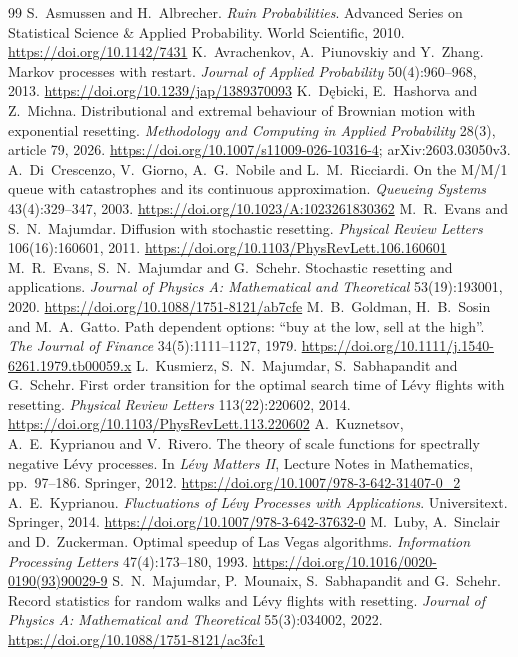 \documentclass[11pt,a4paper]{article}
\begin{document}
\begin{thebibliography}{99}\small
{} S.~Asmussen and H.~Albrecher. \emph{Ruin Probabilities}. Advanced Series on Statistical Science \& Applied Probability. World Scientific, 2010. \url{https://doi.org/10.1142/7431}
 K.~Avrachenkov, A.~Piunovskiy and Y.~Zhang. Markov processes with restart. \emph{Journal of Applied Probability} 50(4):960--968, 2013. \url{https://doi.org/10.1239/jap/1389370093}
 K.~D\k{e}bicki, E.~Hashorva and Z.~Michna. Distributional and extremal behaviour of Brownian motion with exponential resetting. \emph{Methodology and Computing in Applied Probability} 28(3), article 79, 2026. \url{https://doi.org/10.1007/s11009-026-10316-4}; arXiv:2603.03050v3.
 A.~Di~Crescenzo, V.~Giorno, A.~G.~Nobile and L.~M.~Ricciardi. On the M/M/1 queue with catastrophes and its continuous approximation. \emph{Queueing Systems} 43(4):329--347, 2003. \url{https://doi.org/10.1023/A:1023261830362}
 M.~R.~Evans and S.~N.~Majumdar. Diffusion with stochastic resetting. \emph{Physical Review Letters} 106(16):160601, 2011. \url{https://doi.org/10.1103/PhysRevLett.106.160601}
 M.~R.~Evans, S.~N.~Majumdar and G.~Schehr. Stochastic resetting and applications. \emph{Journal of Physics A: Mathematical and Theoretical} 53(19):193001, 2020. \url{https://doi.org/10.1088/1751-8121/ab7cfe}
 M.~B.~Goldman, H.~B.~Sosin and M.~A.~Gatto. Path dependent options: ``buy at the low, sell at the high''. \emph{The Journal of Finance} 34(5):1111--1127, 1979. \url{https://doi.org/10.1111/j.1540-6261.1979.tb00059.x}
 L.~Kusmierz, S.~N.~Majumdar, S.~Sabhapandit and G.~Schehr. First order transition for the optimal search time of L\'evy flights with resetting. \emph{Physical Review Letters} 113(22):220602, 2014. \url{https://doi.org/10.1103/PhysRevLett.113.220602}
 A.~Kuznetsov, A.~E.~Kyprianou and V.~Rivero. The theory of scale functions for spectrally negative L\'evy processes. In \emph{L\'evy Matters II}, Lecture Notes in Mathematics, pp.~97--186. Springer, 2012. \url{https://doi.org/10.1007/978-3-642-31407-0_2}
 A.~E.~Kyprianou. \emph{Fluctuations of L\'evy Processes with Applications}. Universitext. Springer, 2014. \url{https://doi.org/10.1007/978-3-642-37632-0}
 M.~Luby, A.~Sinclair and D.~Zuckerman. Optimal speedup of Las Vegas algorithms. \emph{Information Processing Letters} 47(4):173--180, 1993. \url{https://doi.org/10.1016/0020-0190(93)90029-9}
 S.~N.~Majumdar, P.~Mounaix, S.~Sabhapandit and G.~Schehr. Record statistics for random walks and L\'evy flights with resetting. \emph{Journal of Physics A: Mathematical and Theoretical} 55(3):034002, 2022. \url{https://doi.org/10.1088/1751-8121/ac3fc1}

\end{thebibliography}
\end{document}
